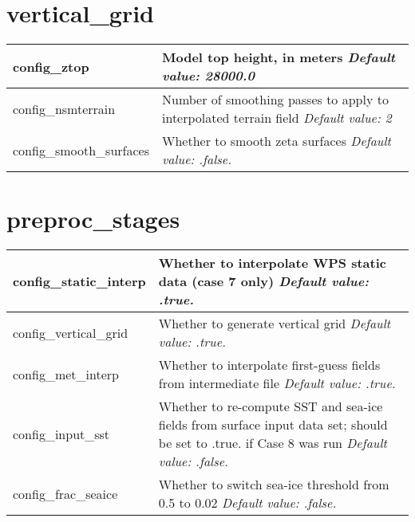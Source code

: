 \section{vertical\_grid}

{\small
\begin{longtable}{|p{1.75in} |p{4.5in}|}
 \hline
   config\_ztop            & Model top height, in meters \newline 
   {\em Default value: 28000.0} \\ \hline
   
   config\_nsmterrain      & Number of smoothing passes to apply to interpolated terrain field \newline 
   {\em Default value: 2} \\ \hline
   
   config\_smooth\_surfaces & Whether to smooth zeta surfaces \newline 
   {\em Default value: .false.} \\ \hline
\end{longtable}
}

\section{preproc\_stages}

{\small
\begin{longtable}{|p{1.5in} |p{4.75in}|}
 \hline 
   config\_static\_interp   & Whether to interpolate WPS static data (case 7 only) \newline 
   {\em Default value: .true.} \\ \hline

   config\_vertical\_grid   & Whether to generate vertical grid \newline 
   {\em Default value: .true.} \\ \hline

   config\_met\_interp      & Whether to interpolate first-guess fields from intermediate file \newline 
   {\em Default value: .true.} \\ \hline
  
 
   config\_input\_sst       & Whether to re-compute SST and sea-ice fields from surface input data set; should be set to .true. if Case 8 was run \newline 
   {\em Default value: .false.} \\ \hline
    
   config\_frac\_seaice       & Whether to switch sea-ice threshold from 0.5 to 0.02 \newline 
   {\em Default value: .false.} \\ \hline
\end{longtable}
}

